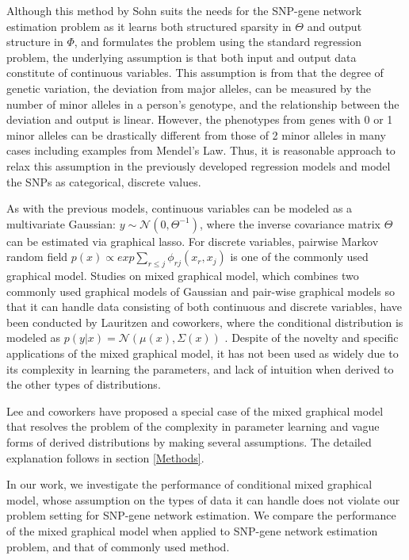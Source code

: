\documentclass{article}
\begin{document}
Although this method by Sohn suits the needs for the SNP-gene network estimation problem as it learns both structured sparsity in $\Theta$ and output structure in $\Phi$, and formulates the problem using the standard regression problem, the underlying assumption is that both input and output data constitute of continuous variables. This assumption is from that the degree of genetic variation, the deviation from major alleles, can be measured by the number of minor alleles in a person's genotype, and the relationship between the deviation and output is linear. However, the phenotypes from genes with 0 or 1 minor alleles can be drastically different from those of 2 minor alleles in many cases including examples from Mendel's Law.  Thus, it is reasonable approach to relax this assumption in the previously developed regression models and model the SNPs as categorical, discrete values.

As with the previous models, continuous variables can be modeled as a multivariate Gaussian: $y \sim \mathcal{N}(0, \Theta^{-1})$, where the inverse covariance matrix $\Theta$ can be estimated via graphical lasso. For discrete variables, pairwise Markov random field $p(x) \propto exp \sum_{r\leq j} \phi_{rj}(x_r, x_j)$ is one of the commonly used graphical model.
Studies on mixed graphical model, which combines two commonly used graphical models of Gaussian and pair-wise graphical models so that it can handle data consisting of both continuous and discrete variables, have been conducted by Lauritzen and coworkers, where the conditional distribution is modeled as $p(y|x) = \mathcal{N}(\mu(x), \Sigma(x))$ \cite{lauritzen1989graphical}.
Despite of the novelty and specific applications of the mixed graphical model, it has not been used as widely due to its complexity in learning the parameters, and lack of intuition when derived to the other types of distributions.

Lee and coworkers \cite{lee2013structure} have proposed a special case of the mixed graphical model that resolves the problem of the complexity in parameter learning and vague forms of derived distributions by making several assumptions.
 The detailed explanation follows in section \ref{Methods}.
 
In our work, we investigate the performance of conditional mixed graphical model, whose assumption on the types of data it can handle does not violate our problem setting for SNP-gene network estimation. We compare the performance of the mixed graphical model when applied to SNP-gene network estimation problem, and that of commonly used method.
\end{document}
